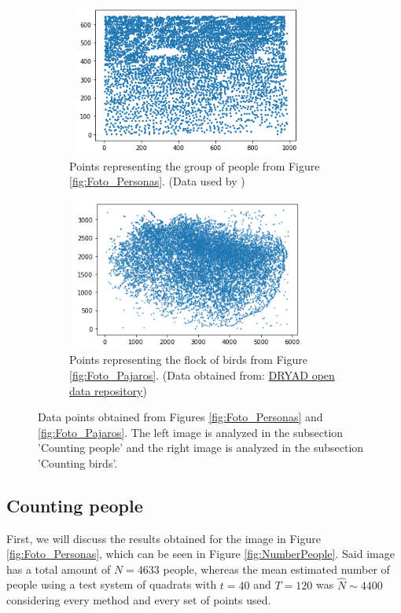\begin{figure}[h!]
  \begin{center}
  \begin{subfigure}[h!]{80mm}
    \includegraphics[width=80mm, height=50mm]{Figuras/PuntosPersonas.png}\par
    \caption{Points representing the group of people from Figure \ref{fig:Foto_Personas}. (Data used by \cite{personas})}
    \label{fig:Foto1}
  \end{subfigure}
  \hfill
  \begin{subfigure}[h!]{80mm}
    \includegraphics[width=80mm, height=50mm]{Figuras/PuntosPajaros.png}\par
    \caption{Points representing the flock of birds from Figure \ref{fig:Foto_Pajaros}. (Data obtained from: \href{https://datadryad.org/stash/dataset/doi:10.5061/dryad.98sf7m0hx}{DRYAD open data repository})}
    \label{fig:Foto2}
  \end{subfigure}
  
  \caption{Data points obtained from Figures \ref{fig:Foto_Personas} and \ref{fig:Foto_Pajaros}. The left image is analyzed in the subsection 'Counting people' and the right image is analyzed in the subsection 'Counting birds'.}
  \label{fig:Fotos_Puntos}
  \end{center}
\end{figure}


\subsection{Counting people}
First, we will discuss the results obtained for the image in Figure \ref{fig:Foto_Personas}, which can be seen in Figure \ref{fig:NumberPeople}. Said image has a total amount of $N=4633$ people, whereas the mean estimated number of people using a test system of quadrats with $t=40$ and $T=120$ was $\widehat{N}\sim 4400$ considering every method and every set of points used.\\


